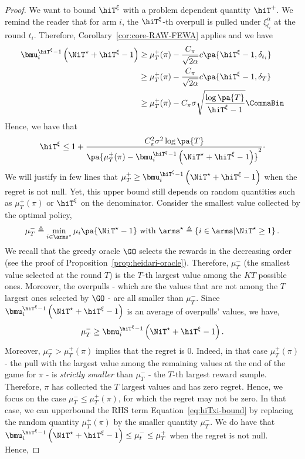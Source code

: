 \begin{proof}

We want to bound $\hiT^\xi $ with a problem dependent quantity $\hiT^+$. We remind the reader that for arm $i$, the $\hiT^\xi$-th overpull is pulled under $\xi^\alpha_{t_i}$ at the round $t_i$. Therefore, Corollary~\ref{cor:core-RAW-FEWA} applies and we have
\begin{align*}
\bmu_i^{\hiT^\xi  - 1} \left( \NiT^\star + \hiT^\xi   - 1 \right) &\geq \mu_T^+(\pi) - \frac{C_\pi}{\sqrt{2\alpha}} c\pa{\hiT^\xi   - 1, \delta_{t_i}}
\\& \geq \mu_T^+(\pi) - \frac{C_\pi}{\sqrt{2\alpha}} c\pa{\hiT^\xi   - 1, \delta_T}
\\& \geq \mu_T^+(\pi) - C_\pi \sigma \sqrt{\frac{\log\pa{T}}{\hiT^\xi-1}}\CommaBin
\end{align*}
Hence, we have that 
\begin{equation}
\label{eq:hiTxi-bound}
\hiT^\xi \leq 1 + \frac{C_\pi^2 \sigma^2\log\pa{T}}{\pa{\mu_T^+(\pi)- \bmu_i^{\hiT^\xi  - 1} \left( \NiT^\star + \hiT^\xi   - 1 \right) }^2 }\cdot
\end{equation}
%
We will justify in few lines that $\mu_T^+ \geq \bmu_i^{\hiT^\xi  - 1} \left( \NiT^\star + \hiT^\xi   - 1 \right)$ when the regret is not null. Yet, this upper bound still depends on random quantities such as $\mu_T^+(\pi)$ or $\hiT^\xi$ on the denominator. 
Consider the smallest value collected by the optimal policy, 
\[
\mu^-_T\triangleq \min_{i \in \arms^\star} \mu_i \pa{\NiT^\star -1}\text{ with } \arms^\star \triangleq\left\{ i \in \arms | \NiT^\star \geq 1 \right\}.
\]
We recall that the greedy oracle $\GO$ selects the rewards in the decreasing order (see the proof of Proposition~\ref{prop:heidari-oracle}). Therefore, $\mu^-_T$ (the smallest value selected at the round $T$) is the $T$-th largest value among the $KT$ possible ones. Moreover, the overpulls - which are the values that are not among the $T$ largest ones selected by $\GO$ - are all smaller than $\mu^-_T$. Since $\bmu_i^{\hiT^\xi  - 1} \left( \NiT^\star + \hiT^\xi  - 1 \right)$ is an average of overpulls' values, we have,
\[\mu^-_T\geq \bmu_i^{\hiT^\xi  - 1} \left( \NiT^\star + \hiT^\xi   - 1 \right).\] 
%
Moreover, $\mu_T^- > \mu_T^+(\pi)$ implies that the regret is 0. Indeed, in that case $\mu_T^+(\pi)$ - the pull with the largest value among the remaining values at the end of the game for $\pi$ - is \emph{strictly smaller} than $\mu_T^-$ - the $T$-th largest reward sample.  Therefore, $\pi$ has collected the $T$ largest values and has zero regret. Hence, we focus on the case $\mu^-_T\leq \mu^+_T(\pi)$, for which the regret may not be zero.  In that case, we can upperbound the RHS term Equation~\ref{eq:hiTxi-bound} by replacing the random quantity $\mu_T^+(\pi)$ by the smaller quantity $\mu^-_T$. We do have that $\bmu_i^{\hiT^\xi  - 1} \left( \NiT^\star + \hiT^\xi   - 1 \right) \leq \mu^-_t \leq \mu^+_T$ when the regret is not null. Hence, 

\end{proof}
